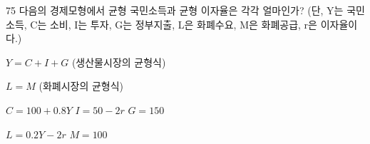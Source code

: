 \begin{question}{75}
다음의 경제모형에서 균형 국민소득과 균형 이자율은 각각 얼마인가? (단, Y는 국민소득, C는 소비, I는 투자, G는 정부지출, L은 화폐수요, M은 화폐공급, r은 이자율이다.)
\begin{framedtext}
$Y = C + I + G$ (생산물시장의 균형식) \par
$L = M$ (화폐시장의 균형식) \par
$C = 100 + 0.8Y$ \qquad $I = 50 - 2r$ \qquad $G = 150$ \par
$L = 0.2Y - 2r$ \qquad $M = 100$
\end{framedtext}
\par\smallskip
\hspace{1.2cm}\uline{}\hspace{1em}\uline{}\par
\begin{choices}
  \item {}\hspace{1em}
  \item {}\hspace{1em}
  \item {}\hspace{1em}
  \item {}\hspace{1em}
  \item {}\hspace{1em}
\end{choices}
\end{question}
